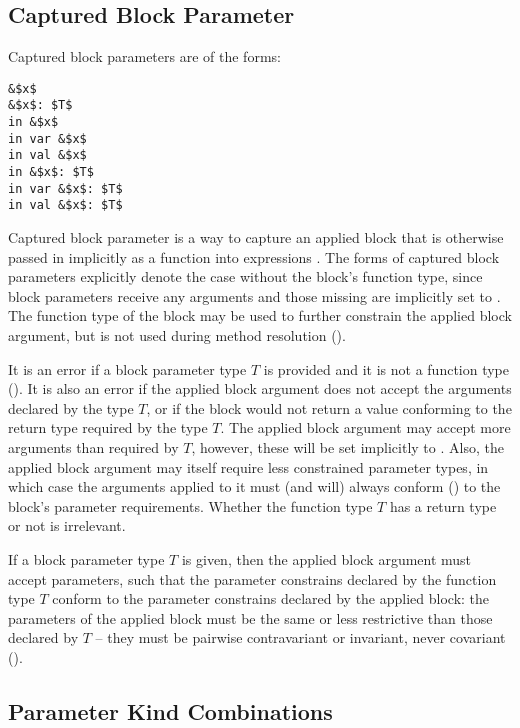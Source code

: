 \subsection{Captured Block Parameter}
\label{sec:captured-block-parameter}

Captured block parameters are of the forms:
\begin{lstlisting}
&$x$
&$x$: $T$
in &$x$
in var &$x$
in val &$x$
in &$x$: $T$
in var &$x$: $T$
in val &$x$: $T$
\end{lstlisting}

Captured block parameter is a way to capture an applied block that is otherwise passed in implicitly as a function into  expressions . The forms of captured block parameters explicitly denote the case without the block's function type, since block parameters receive any arguments and those missing are implicitly set to . The function type of the block may be used to further constrain the applied block argument, but is not used during method resolution (). 

It is an error if a block parameter type $T$ is provided and it is not a function type (). It is also an error if the applied block argument does not accept the arguments declared by the type $T$, or if the block would not return a value conforming to the return type required by the type $T$. The applied block argument may accept more arguments than required by $T$, however, these will be set implicitly to . Also, the applied block argument may itself require less constrained parameter types, in which case the arguments applied to it must (and will) always conform () to the block's parameter requirements. Whether the function type $T$ has a return type or not is irrelevant. 

If a block parameter type $T$ is given, then the applied block argument must accept parameters, such that the parameter constrains declared by the function type $T$ conform to the parameter constrains declared by the applied block: the parameters of the applied block must be the same or less restrictive than those declared by $T$ -- they must be pairwise contravariant or invariant, never covariant (). 

\subsection{Parameter Kind Combinations}

